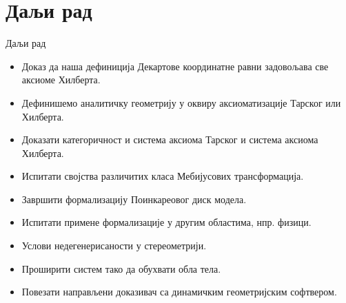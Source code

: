 \documentclass[slidestop, compress, mathserif, containsverbatim, xcolor=dvipsnames]{beamer}
\begin{document}
\section{Даљи рад}

\begin{frame}[shrink]{Даљи рад}
  \begin{itemize}
  \item Доказ да наша дефиниција Декартове координатне равни
    задовољава све аксиоме Хилберта.
  \item Дефинишемо аналитичку геометрију у оквиру аксиоматизације
    Тарског или Хилберта.
  \item Доказати категоричност и система аксиома Тарског и система
    аксиома Хилберта.
  \item Испитати својства различитих класа Мебијусових трансформација.
  \item Завршити формализацију Поинкареовог диск модела.
  \item Испитати примене формализације у другим областима,
    нпр. физици.
  \item Услови недегенерисаности у стереометрији.
  \item Проширити систем тако да обухвати обла тела.
  \item Повезати направљени доказивач са динамичким геометријским
    софтвером.
  \end{itemize}
\end{frame}
\end{document}

